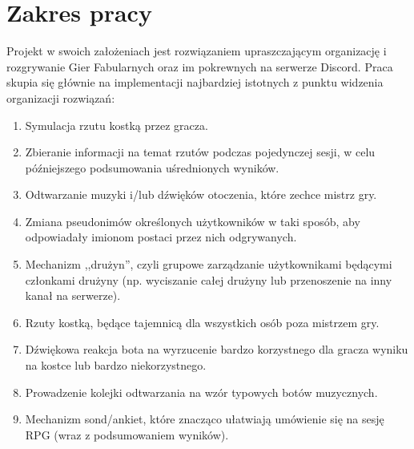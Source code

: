 \documentclass[shortabstract,inz]{iithesis}
\begin{document}
		\section*{Zakres pracy}
		Projekt w swoich założeniach jest rozwiązaniem upraszczającym organizację i rozgrywanie Gier Fabularnych oraz im pokrewnych na serwerze Discord. Praca skupia się głównie na implementacji najbardziej istotnych z punktu widzenia organizacji rozwiązań:
		\begin{enumerate}
			\item Symulacja rzutu kostką przez gracza.
			\item Zbieranie informacji na temat rzutów podczas pojedynczej sesji, w celu późniejszego podsumowania uśrednionych wyników.
			\item Odtwarzanie muzyki i/lub dźwięków otoczenia, które zechce mistrz gry.
			\item Zmiana pseudonimów określonych użytkowników w taki sposób, aby odpowiadały imionom postaci przez nich odgrywanych.
			\item Mechanizm ,,drużyn'', czyli grupowe zarządzanie użytkownikami będącymi członkami drużyny (np. wyciszanie całej drużyny lub przenoszenie na inny kanał na serwerze).
			\item Rzuty kostką, będące tajemnicą dla wszystkich osób poza mistrzem gry.
			\item Dźwiękowa reakcja bota na wyrzucenie bardzo korzystnego dla gracza wyniku na kostce lub bardzo niekorzystnego.
			\item Prowadzenie kolejki odtwarzania na wzór typowych botów muzycznych.
			\item Mechanizm sond/ankiet, które znacząco ułatwiają umówienie się na sesję RPG (wraz z podsumowaniem wyników).
		\end{enumerate}
	
\end{document}
